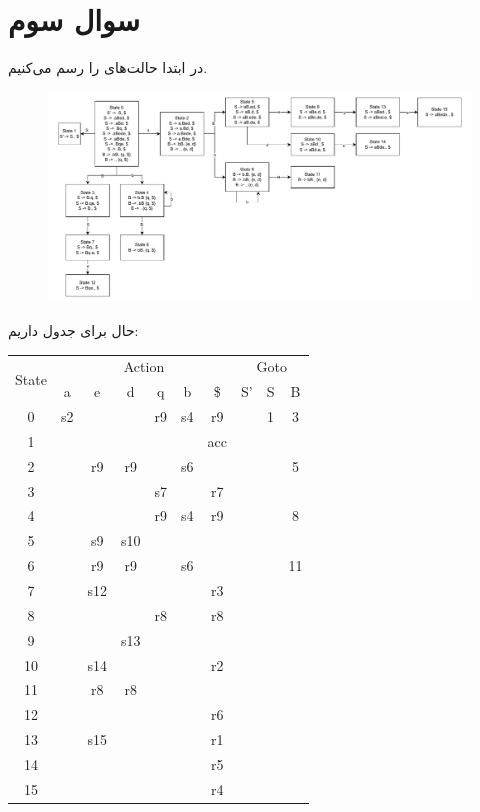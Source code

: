 \documentclass[]{article}
\begin{document}
\section*{سوال سوم}
در ابتدا حالت‌های
را رسم می‌کنیم.
\begin{figure}[h]
    \centering
    \includegraphics[width=1\textwidth]{figure/Q3-LR.pdf}
\end{figure}
حال برای جدول داریم:
\begin{latin}
    \centering
    \begin{tabular}{|c|c|c|c|c|c|c|c|c|c|}
        \hline
        \multirow{2}{*}{State} & \multicolumn{6}{|c|}{Action} & \multicolumn{3}{|c|}{Goto}\\
        \cline{2-10}
&a&e&d&q&b&\$&S'&S&B\\
\hline
0&s2& & &r9&s4&r9& &1&3\\
\hline
1& & & & & &acc& & & \\
\hline
2& &r9&r9& &s6& & & &5\\
\hline
3& & & &s7& &r7& & & \\
\hline
4& & & &r9&s4&r9& & &8\\
\hline
5& &s9&s10& & & & & & \\
\hline
6& &r9&r9& &s6& & & &11\\
\hline
7& &s12& & & &r3& & & \\
\hline
8& & & &r8& &r8& & & \\
\hline
9& & &s13& & & & & & \\
\hline
10& &s14& & & &r2& & & \\
\hline
11& &r8&r8& & & & & & \\
\hline
12& & & & & &r6& & & \\
\hline
13& &s15& & & &r1& & & \\
\hline
14& & & & & &r5& & & \\
\hline
15& & & & & &r4& & & \\
\hline
    \end{tabular}
\end{latin}
\end{document}
